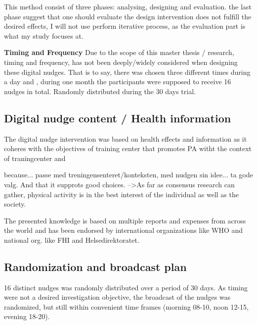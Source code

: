 This method consist of three phases: analysing, designing and evaluation. the last phase suggest that one should evaluate the design intervention does not fulfill the desired effects, I will not use perform iterative process, as the evaluation part is what my study focuses at. 

\textbf{Timing and Frequency }
Due to the scope of this master thesis / research, timing and frequency, has not been deeply/widely considered when designing these digital nudges.  That is to say, there was chosen three different times during a day and , during one month the participants were supposed to receive 16 nudges in total. Randomly distributed during the 30 days trial.  

\subsection{Digital nudge content / Health information}
The digital nudge intervention was based on health effects and information as it coheres with the objectives of training center that promotes PA witht the context of traningcenter and 

because... passe med treningensenteret/konteksten, med nudgen sin idee... ta gode valg.
And that it supprots good choices. -->As far as consensus research can gather, physical activity is in the best interest of the individual as well as the society. 

The presented knowledge is based on multiple reports and expenses from across the world and has been endorsed by international organizations like WHO and national org. like FHI and Helsedirektoratet. 


\subsection{Randomization and broadcast plan}
16 distinct nudges was randomly distributed over a period of 30 days. As timing were not a desired investigation objective, the broadcast of the nudges was randomized, but still within convenient time frames (morning 08-10, noon 12-15, evening 18-20). 

